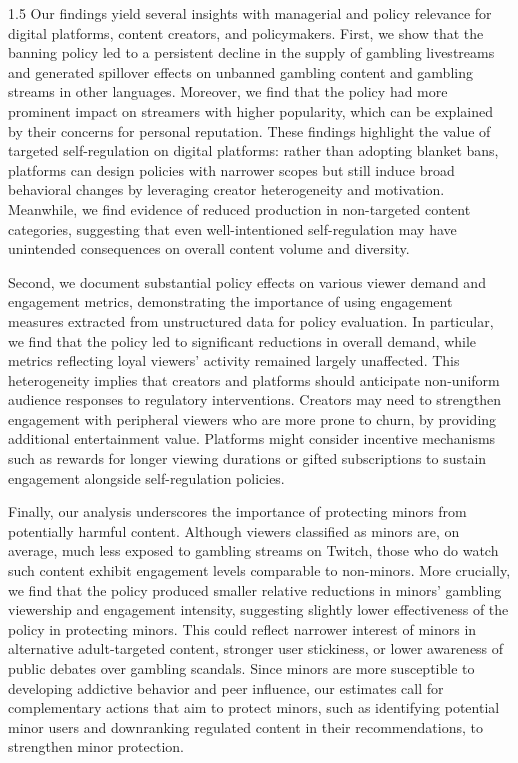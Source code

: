 \documentclass[a4paper,12pt]{article}
\begin{document}
\begin{spacing}{1.5}
Our findings yield several insights with managerial and policy relevance for digital platforms, content creators, and policymakers. First, we show that the banning policy led to a persistent decline in the supply of gambling livestreams and generated spillover effects on unbanned gambling content and gambling streams in other languages. Moreover, we find that the policy had more prominent impact on streamers with higher popularity, which can be explained by their concerns for personal reputation. These findings highlight the value of targeted self-regulation on digital platforms: rather than adopting blanket bans, platforms can design policies with narrower scopes but still induce broad behavioral changes by leveraging creator heterogeneity and motivation. Meanwhile, we find evidence of reduced production in non-targeted content categories, suggesting that even well-intentioned self-regulation may have unintended consequences on overall content volume and diversity.

Second, we document substantial policy effects on various viewer demand and engagement metrics, demonstrating the importance of using engagement measures extracted from unstructured data for policy evaluation. In particular, we find that the policy led to significant reductions in overall demand, while metrics reflecting loyal viewers’ activity remained largely unaffected. This heterogeneity implies that creators and platforms should anticipate non-uniform audience responses to regulatory interventions. Creators may need to strengthen engagement with peripheral viewers who are more prone to churn, by providing additional entertainment value. Platforms might consider incentive mechanisms such as rewards for longer viewing durations or gifted subscriptions to sustain engagement alongside self-regulation policies.

Finally, our analysis underscores the importance of protecting minors from potentially harmful content. Although viewers classified as minors are, on average, much less exposed to gambling streams on Twitch, those who do watch such content exhibit engagement levels comparable to non-minors. More crucially, we find that the policy produced smaller relative reductions in minors’ gambling viewership and engagement intensity, suggesting slightly lower effectiveness of the policy in protecting minors. This could reflect narrower interest of minors in alternative adult-targeted content, stronger user stickiness, or lower awareness of public debates over gambling scandals. Since minors are more susceptible to developing addictive behavior and peer influence, our estimates call for complementary actions that aim to protect minors, such as identifying potential minor users and downranking regulated content in their recommendations, to strengthen minor protection.


\end{spacing}
\end{document}
